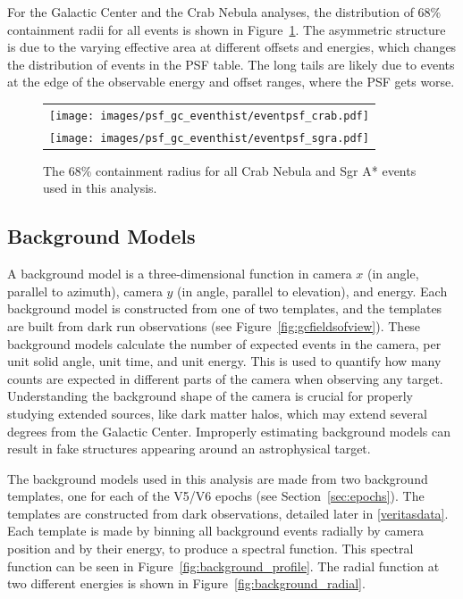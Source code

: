     For the Galactic Center and the Crab Nebula analyses, the distribution of 68\% containment radii for all events is shown in Figure~\ref{fig:gc_psf_hist}.
    The asymmetric structure is due to the varying effective area at different offsets and energies, which changes the distribution of events in the PSF table.
    The long tails are likely due to events at the edge of the observable energy and offset ranges, where the PSF gets worse.

    \begin{figure}[!hb]
      \centering
      \begin{tabular}{c}
        \texttt{[image: images/psf\_gc\_eventhist/eventpsf\_crab.pdf]} \\
        \texttt{[image: images/psf\_gc\_eventhist/eventpsf\_sgra.pdf]}
      \end{tabular}
      \caption[Crab and Galactic Center Event PSFs]{
        The 68\% containment radius for all Crab Nebula and Sgr A* events used in this analysis.
      }
      \label{fig:gc_psf_hist}
    \end{figure}
  
  \FloatBarrier
  
  \subsection{Background Models}\label{background_production}
  
    A background model is a three-dimensional function in camera $x$ (in angle, parallel to azimuth), camera $y$ (in angle, parallel to elevation), and energy.
    Each background model is constructed from one of two templates, and the templates are built from dark run observations (see Figure~\ref{fig:gcfieldsofview}).
    These background models calculate the number of expected events in the camera, per unit solid angle, unit time, and unit energy.
    This is used to quantify how many counts are expected in different parts of the camera when observing any target.
    Understanding the background shape of the camera is crucial for properly studying extended sources, like dark matter halos, which may extend several degrees from the Galactic Center.
    Improperly estimating background models can result in fake structures appearing around an astrophysical target.
    
    The background models used in this analysis are made from two background templates, one for each of the V5/V6 epochs (see Section~\ref{sec:epochs}).
    The templates are constructed from dark observations, detailed later in \ref{veritasdata}.
    Each template is made by binning all background events radially by camera position and by their energy, to produce a spectral function.
    This spectral function can be seen in Figure~\ref{fig:background_profile}.
    The radial function at two different energies is shown in Figure~\ref{fig:background_radial}.

